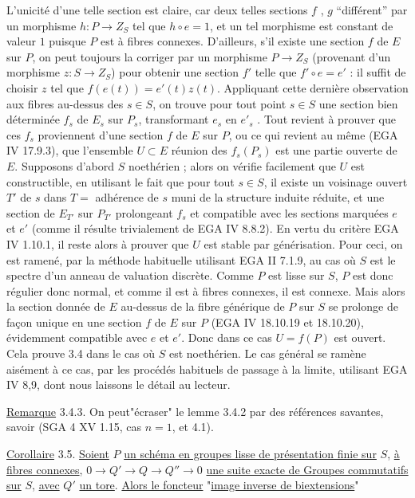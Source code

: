 L'unicité d'une telle section est claire, car deux telles sections $f$ , $g$ ``différent'' par un morphisme $h : P \longrightarrow Z_{S}$ tel que $h \circ e = 1$, et un tel morphisme est constant de valeur $1$ puisque $P$ est à fibres connexes. D'ailleurs, s'il existe une section $f$ de $E$ sur $P$, on peut toujours la corriger par un morphisme $P \longrightarrow Z_{S}$ (provenant d'un morphisme $z : S \longrightarrow Z_{S}$) pour obtenir une section $f'$ telle que $f' \circ e = e'$ : il suffit de choisir $z$ tel que $f(e(t)) = e'(t)z(t)$. Appliquant cette dernière observation aux fibres au-dessus des $s \in S$, on trouve pour tout point $s \in S$ une section bien déterminée $f_{s}$ de $E_{s}$ sur $P_{s}$, transformant $e_{s}$ en $e'_{s}$ . Tout revient à prouver que ces $f_{s}$ proviennent d'une section $f$ de $E$ sur $P$, ou ce qui revient au même (EGA IV 17.9.3), que l'ensemble $U \subset E$ réunion des $f_{s}(P_{s})$ est une partie ouverte de $E$. Supposons d'abord $S$ noethérien ; alors on vérifie facilement que $U$ est constructible, en utilisant le fait que pour tout $s \in S$, il existe un voisinage ouvert $T'$ de $s$ dans $T = {}$ adhérence de $s$ muni de la structure induite réduite, et une section de $E_{T'}$ sur $P_{T'}$ prolongeant $f_{s}$ et compatible avec les sections marquées $e$ et $e'$ (comme il résulte trivialement de EGA IV 8.8.2). En vertu du critère EGA IV 1.10.1, il reste alors à prouver que $U$ est stable par générisation. Pour ceci, on est ramené, par la méthode habituelle utilisant EGA II 7.1.9, au cas où $S$ est le spectre d'un anneau de valuation discrète. Comme $P$ est lisse sur $S$,
$P$ est donc régulier donc normal, et comme il est à fibres connexes, il est connexe. Mais alors la section donnée de $E$ au-dessus de la fibre générique de $P$ sur $S$ se prolonge de façon unique en une section $f$ de $E$ sur $P$ (EGA IV 18.10.19 et 18.10.20), évidemment compatible avec $e$ et $e'$. Donc dans ce cas $U = f(P)$ est ouvert. Cela prouve 3.4 dans le cas où $S$ est noethérien. Le cas général se ramène aisément à ce cas, par les procédés habituels de passage à la limite, utilisant EGA IV 8,9, dont nous laissons le détail au lecteur.

\underline{Remarque} 3.4.3. On peut"écraser" le lemme 3.4.2 par des références savantes, savoir (SGA 4 XV 1.15, cas $n=1$, et 4.1).

\underline{Corollaire} 3.5. \underline{Soient} $P$ \underline{un schéma en groupes lisse de présentation finie sur} $S$, \underline{à fibres connexes}, $0 \longrightarrow Q' \longrightarrow Q \longrightarrow Q'' \longrightarrow 0$ \underline{une suite exacte de Groupes commutatifs sur} $S$, \underline{avec} $Q'$ \underline{un tore}. \underline{Alors le foncteur} "\underline{image inverse de biextensions}"

